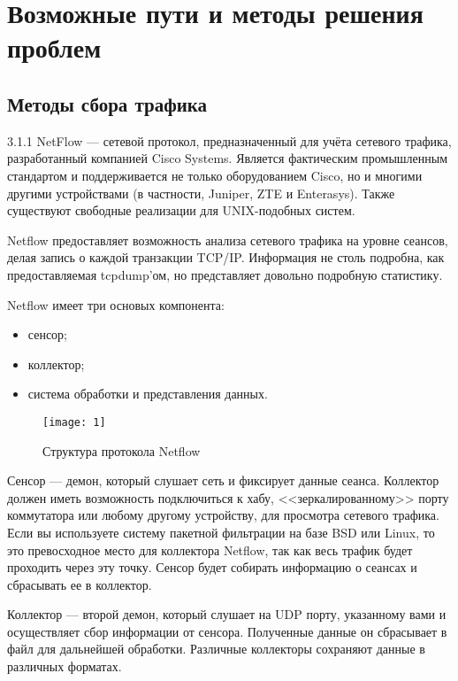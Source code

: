 \section{Возможные пути и методы решения проблем}

\subsection{Методы сбора трафика}

3.1.1  NetFlow --- сетевой протокол, предназначенный для учёта сетевого трафика, разработанный компанией Cisco Systems. Является фактическим промышленным стандартом и поддерживается не только оборудованием Cisco, но и многими другими устройствами (в частности, Juniper, ZTE и Enterasys). Также существуют свободные реализации для UNIX-подобных систем.\par

Netflow предоставляет возможность анализа сетевого трафика на уровне сеансов, делая запись о каждой транзакции TCP/IP. Информация не столь подробна, как предоставляемая tcpdump'ом, но представляет довольно подробную статистику.\par 

Netflow имеет три основых компонента:
\begin{itemize}
	\item сенсор;
	\item коллектор;
	\item система обработки и представления данных.
\end{itemize}

\begin{figure}[h!]
    \centering
    \texttt{[image: 1]}
    \caption{Структура протокола Netflow}
    \label{img:1}
\end{figure} 

Сенсор --- демон, который слушает сеть и фиксирует данные сеанса. Коллектор должен иметь возможность подключиться к хабу, <<зеркалированному>> порту коммутатора или любому другому устройству, для просмотра сетевого трафика. Если вы используете систему пакетной фильтрации на базе BSD или Linux, то это превосходное место для коллектора Netflow, так как весь трафик будет проходить через эту точку. Сенсор будет собирать информацию о сеансах и сбрасывать ее в коллектор.\par 

Коллектор --- второй демон, который слушает на UDP порту, указанному вами и осуществляет сбор информации от сенсора. Полученные данные он сбрасывает в файл для дальнейшей обработки. Различные коллекторы сохраняют данные в различных форматах.\par 

